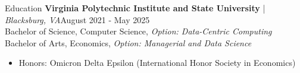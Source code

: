 \begin{rSection}{Education}
    \textbf{Virginia Polytechnic Institute and State University} | \textit{Blacksburg, VA}\hfill {August 2021 - May 2025} \\[0.3em]
    Bachelor of Science, Computer Science, \textit{Option: Data-Centric Computing} \\ 
    Bachelor of Arts, Economics, \textit{Option: Managerial and Data Science} 

    \begin{itemize}[leftmargin=12pt]
        \itemsep -4pt {} \vspace{-0.5em}
        \item[\raisebox{0.4ex}{\rule{0.8ex}{0.8ex}}] Honors: Omicron Delta Epsilon (International Honor Society in Economics)
    \end{itemize}
\end{rSection}
